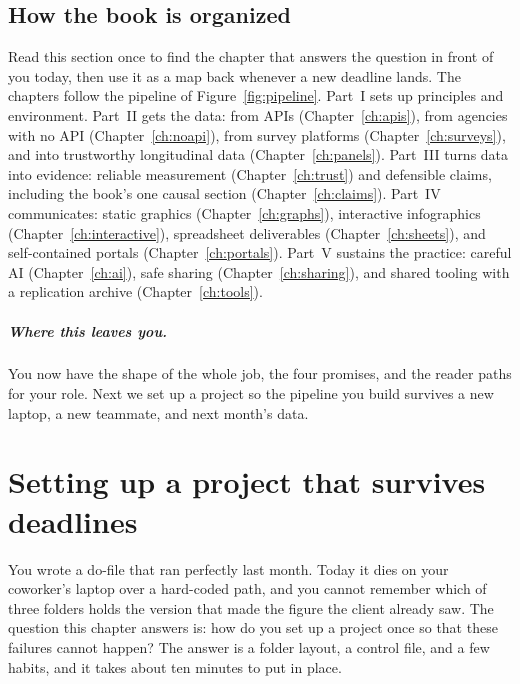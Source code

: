 \documentclass[
    a4paper,
    fontsize=10pt,
    twoside=true,
    numbers=noenddot,
]{kaobook}
\begin{document}
\section{How the book is organized}
Read this section once to find the chapter that answers the question in front of you today, then use it as a map back whenever a new deadline lands. The chapters follow the pipeline of Figure~\ref{fig:pipeline}. Part~I sets up principles and environment. Part~II gets the data: from APIs (Chapter~\ref{ch:apis}), from agencies with no API (Chapter~\ref{ch:noapi}), from survey platforms (Chapter~\ref{ch:surveys}), and into trustworthy longitudinal data (Chapter~\ref{ch:panels}). Part~III turns data into evidence: reliable measurement (Chapter~\ref{ch:trust}) and defensible claims, including the book's one causal section (Chapter~\ref{ch:claims}). Part~IV communicates: static graphics (Chapter~\ref{ch:graphs}), interactive infographics (Chapter~\ref{ch:interactive}), spreadsheet deliverables (Chapter~\ref{ch:sheets}), and self-contained portals (Chapter~\ref{ch:portals}). Part~V sustains the practice: careful AI (Chapter~\ref{ch:ai}), safe sharing (Chapter~\ref{ch:sharing}), and shared tooling with a replication archive (Chapter~\ref{ch:tools}).

\paragraph{Where this leaves you.} You now have the shape of the whole job, the four promises, and the reader paths for your role. Next we set up a project so the pipeline you build survives a new laptop, a new teammate, and next month's data.

\chapter{Setting up a project that survives deadlines}\label{ch:workshop}

You wrote a do-file that ran perfectly last month. Today it dies on your coworker's laptop over a hard-coded path, and you cannot remember which of three folders holds the version that made the figure the client already saw. The question this chapter answers is: how do you set up a project once so that these failures cannot happen? The answer is a folder layout, a control file, and a few habits, and it takes about ten minutes to put in place.
\end{document}
